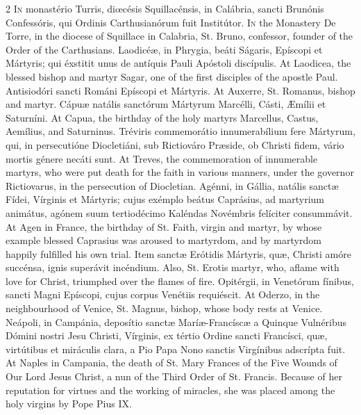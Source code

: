 \begin{paracol}{2}
\lettrine[lines=2]{I}{n} monastério Turris, 
 diœcésis Squillacénsis, in Calábria, sancti Brunónis Confessóris, qui 
 Ordinis Carthusianórum fuit Institútor.
\switchcolumn
{}
\lettrine[lines=2]{I}{n} the Monastery De Torre, in the 
 diocese of Squillace in Calabria, St. Bruno, confessor, founder of the Order 
 of the Carthusians.
\switchcolumn*
{}
Laodicéæ, in Phrygia, 
 beáti Ságaris, Epíscopi et Mártyris; qui éxstitit unus de antíquis Pauli 
 Apóstoli discípulis.
\switchcolumn
{}
At Laodicea, the blessed bishop and 
 martyr Sagar, one of the first disciples of the apostle Paul.
\switchcolumn*
{}
Antisiodóri sancti 
 Románi Epíscopi et Mártyris.
\switchcolumn
{}
At Auxerre, St. Romanus, bishop and 
 martyr.
\switchcolumn*
{}
Cápuæ natális sanctórum 
 Mártyrum Marcélli, Cásti, Æmílii et Saturníni.
\switchcolumn
{}
At Capua, the birthday of the holy 
 martyrs Marcellus, Castus, Aemílius, and Saturninus.
\switchcolumn*
{}
Tréviris commemorátio 
 innumerabílium fere Mártyrum, qui, in persecutióne Diocletiáni, sub 
 Rictiováro Præside, ob Christi fidem, vário mortis génere necáti sunt.
\switchcolumn
{}
At Treves, the commemoration of 
 innumerable martyrs, who were put death for the faith in various manners, 
 under the governor Rictiovarus, in the persecution of Diocletian.
\switchcolumn*
{}
Agénni, in Gállia, 
 natális sanctæ Fídei, Vírginis et Mártyris; cujus exémplo beátus Caprásius, 
 ad martyrium animátus, agónem suum tertiodécimo Kaléndas Novémbris felíciter 
 consummávit.
\switchcolumn
{}
At Agen in France, the birthday of 
 St. Faith, virgin and martyr, by whose example blessed Caprasius was aroused 
 to martyrdom, and by martyrdom happily fulfilled his own trial.
\switchcolumn*
{}
Item sanctæ Erótidis 
 Mártyris, quæ, Christi amóre succénsa, ignis superávit incéndium.
\switchcolumn
{}
Also, St. Erotis martyr, who, aflame 
 with love for Christ, triumphed over the flames of fire.
\switchcolumn*
{}
Opitérgii, in Venetórum 
 fínibus, sancti Magni Epíscopi, cujus corpus Venétiis requiéscit.
\switchcolumn
{}
At Oderzo, in the neighbourhood of 
 Venice, St. Magnus, bishop, whose body rests at Venice.
\switchcolumn*
{}
Neápoli, in Campánia, 
 deposítio sanctæ Maríæ-Francíscæ a Quinque Vulnéribus Dómini nostri Jesu 
 Christi, Vírginis, ex tértio Ordine sancti Francísci, quæ, virtútibus et 
 miráculis clara, a Pio Papa Nono sanctis Virgínibus adscrípta fuit.
\switchcolumn
{}
At Naples in Campania, the death of 
 St. Mary Frances of the Five Wounds of Our Lord Jesus Christ, a nun of the 
 Third Order of St. Francis. Because of her reputation for virtues and 
 the working of miracles, she was placed among the holy virgins by Pope Pius 
 IX.
\switchcolumn*
{}
\end{paracol}


